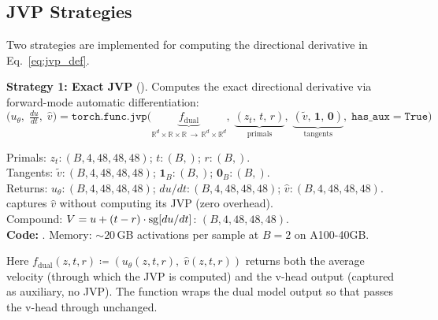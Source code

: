 \subsection{JVP Strategies}
\label{sec:jvp_strat}

Two strategies are implemented for computing the directional derivative in
Eq.~\eqref{eq:jvp_def}.

\textbf{Strategy 1: Exact JVP} ().  Computes the exact
directional derivative via forward-mode automatic differentiation:
\begin{equation}
  \bigl(u_\theta,\;\tfrac{du}{dt},\;\hat{v}\bigr)
    = \texttt{torch.func.jvp}\!\bigl(
        \underbrace{f_{\mathrm{dual}}}_{\mathbb{R}^d \times \mathbb{R} \times \mathbb{R} \,\to\, \mathbb{R}^d \times \mathbb{R}^d},\;
        \underbrace{(z_t,\,t,\,r)}_{\text{primals}},\;
        \underbrace{(\tilde{v},\,\mathbf{1},\,\mathbf{0})}_{\text{tangents}},\;
        \texttt{has\_aux}{=}\texttt{True}\bigr)
  \label{eq:exact_jvp}
\end{equation}
\begin{shapes}
Primals: $z_t \!:\! (B, 4, 48, 48, 48)$; $t \!:\! (B,)$; $r \!:\! (B,)$.\\
Tangents: $\tilde{v} \!:\! (B, 4, 48, 48, 48)$; $\mathbf{1}_B \!:\! (B,)$; $\mathbf{0}_B \!:\! (B,)$.\\
Returns: $u_\theta \!:\! (B, 4, 48, 48, 48)$; $du/dt \!:\! (B, 4, 48, 48, 48)$; $\hat{v} \!:\! (B, 4, 48, 48, 48)$.\\
 captures $\hat{v}$ without computing its JVP (zero overhead).\\
Compound: $V = u + (t-r) \cdot \operatorname{sg}[du/dt]$: $(B, 4, 48, 48, 48)$.\\
\textbf{Code:} .
Memory: ${\sim}20$\,GB activations per sample at $B{=}2$ on A100-40GB.
\end{shapes}

\noindent
Here $f_{\mathrm{dual}}(z,t,r) \coloneqq (u_\theta(z,t,r),\;\hat{v}(z,t,r))$
returns both the average velocity (through which the JVP is computed) and the
v-head output (captured as auxiliary, no JVP).  The function
 wraps the dual model output so that
 passes the v-head through unchanged.

